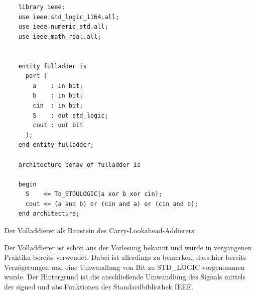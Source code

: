 \documentclass{report}
\newenvironment{longlisting}{\captionsetup{type=listing}}{}
\begin{document}
\begin{longlisting}
  \centering
  \begin{verbatim}
    library ieee;
    use ieee.std_logic_1164.all;
    use ieee.numeric_std.all;
    use ieee.math_real.all;
    
    
    entity fulladder is
      port (
        a    : in bit;
        b    : in bit;
        cin  : in bit;
        S    : out std_logic;
        cout : out bit
      );
    end entity fulladder;
    
    architecture behav of fulladder is
    
    begin
      S    <= To_STDULOGIC(a xor b xor cin);
      cout <= (a and b) or (cin and a) or (cin and b);
    end architecture;
  \end{verbatim}
  \caption{Der Volladdierer als Baustein des Carry-Lookahead-Addierers}
  \label{code:fulladder}
\end{longlisting}
\vspace*{1em}
\noindent
Der Volladdierer ist schon aus der Vorlesung bekannt und wurde in vergangenen Praktika bereits verwendet. Dabei ist allerdings zu bemerken, dass hier bereits Verzögerungen und eine Umwandlung von Bit zu STD\_LOGIC vorgenommen wurde. Der Hintergrund ist die anschließende Umwandlung des Signals mittels der signed und abs Funktionen der Standardbibliothek IEEE.

\newpage
\end{document}
